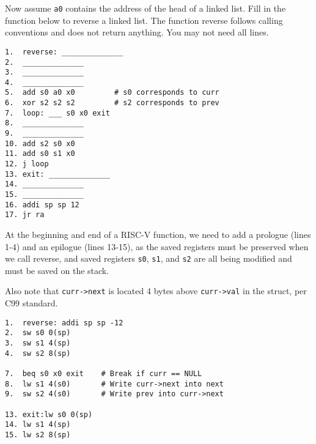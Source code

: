 \begin{blocksection}
Now assume \lstinline$a0$ contains the address of the head of a linked list.  Fill in the function below to reverse a linked list. The function reverse follows calling conventions and does not return anything. You may not need all lines. 

\begin{verbatim}
1.  reverse: ______________
2.  ______________
3.  ______________
4.  ______________
5.  add s0 a0 x0         # s0 corresponds to curr
6.  xor s2 s2 s2         # s2 corresponds to prev
7.  loop: ___ s0 x0 exit
8.  ______________
9.  ______________
10. add s2 s0 x0 
11. add s0 s1 x0 
12. j loop 
13. exit: ______________
14. ______________
15. ______________
16. addi sp sp 12
17. jr ra
\end{verbatim}

\begin{solution}[4in]
At the beginning and end of a RISC-V function, we need to add a prologue (lines 1-4) and an epilogue (lines 13-15), as the saved registers must be preserved when we call reverse, and saved registers \lstinline$s0$, \lstinline$s1$, and \lstinline$s2$ are all being modified and must be saved on the stack.

Also note that \lstinline$curr->next$ is located 4 bytes above \lstinline$curr->val$ in the struct, per C99 standard.

\begin{verbatim}
1.  reverse: addi sp sp -12
2.  sw s0 0(sp) 
3.  sw s1 4(sp) 
4.  sw s2 8(sp) 

7.  beq s0 x0 exit    # Break if curr == NULL
8.  lw s1 4(s0)       # Write curr->next into next
9.  sw s2 4(s0)       # Write prev into curr->next

13. exit:lw s0 0(sp)
14. lw s1 4(sp)
15. lw s2 8(sp)
\end{verbatim}


\end{solution}
\end{blocksection}